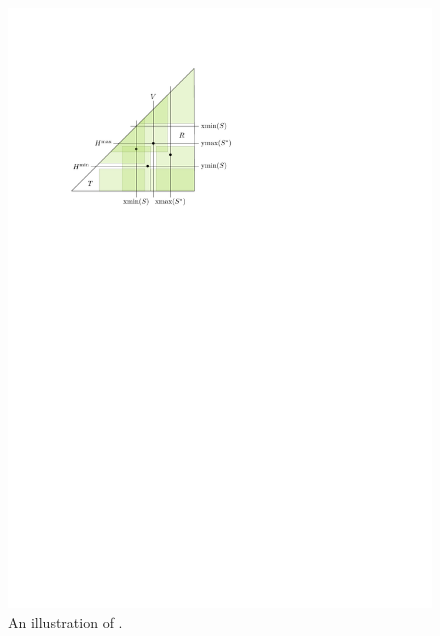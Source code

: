 \documentclass{patmorin}
\begin{document}
\begin{figure}
  \begin{center}
    \includegraphics{figs/survivors}
  \end{center}
  \caption{An illustration of .}
\end{figure}
\end{document}
